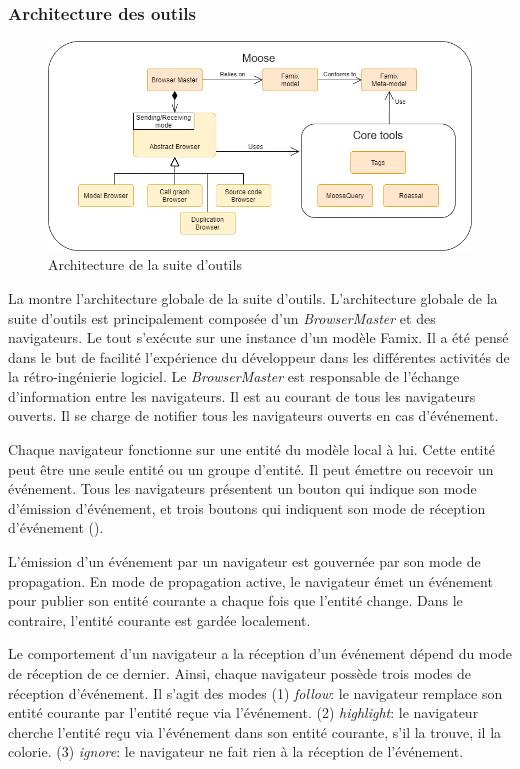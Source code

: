 \documentclass[a4paper]{article}
\newcommand{\browserMaster}{\textit{BrowserMaster} \xspace}
\begin{document}
\subsubsection{Architecture des outils }
\begin{figure}[htbp]
  \begin{center}
  \includegraphics[width=0.8\linewidth]{./figures/architecture.png}
  \caption{Architecture de la suite d'outils}
  \label{fig:applicationArchitecture}
  \end{center}
  \vspace{-0.3cm}
\end{figure}

La  montre l'architecture globale de la suite d'outils.
L'architecture globale de la suite d'outils est principalement composée d'un \browserMaster et des navigateurs.
Le tout s'exécute sur une instance d'un modèle Famix. 
Il a été pensé dans le but de facilité l'expérience du développeur dans les différentes activités de la rétro-ingénierie logiciel.
Le \browserMaster est responsable de l'échange d'information entre les navigateurs.
Il est au courant de tous les navigateurs ouverts. 
Il se charge de notifier tous les navigateurs ouverts en cas d'événement.

Chaque navigateur fonctionne sur une entité du modèle  local à lui.
Cette entité peut être une seule entité ou un groupe d'entité.
Il peut émettre ou recevoir un événement.
Tous les navigateurs présentent un bouton qui indique son mode d'émission d'événement, et trois boutons qui indiquent son mode de réception d'événement (\eg {}).

L'émission d'un événement par un navigateur est gouvernée par son mode de propagation.
En mode de propagation active, le navigateur émet un événement pour publier son entité courante a chaque fois que l'entité change.
Dans le contraire, l'entité courante est gardée localement.

Le comportement d'un navigateur a la réception d'un événement dépend du mode de réception de ce dernier.
Ainsi, chaque navigateur possède trois modes de réception d'événement.  
Il s'agit des modes (1) \textit{follow}: le navigateur  remplace son entité courante par l'entité reçue via l'événement.
(2) \textit{highlight}: le navigateur cherche l'entité reçu via l'événement dans son entité courante, s'il la trouve, il la colorie.
(3) \textit{ignore}: le navigateur ne fait rien à la réception de l'événement.
\end{document}

